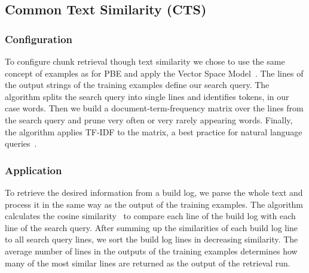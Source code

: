 \subsection{Common Text Similarity (CTS)}
\label{sec:expl-ts}

\subsubsection{Configuration}
To configure chunk retrieval though text similarity we chose to use the same concept of examples as for PBE\@
and apply the Vector Space Model~\cite{schutze2008introduction}.
The lines of the output strings of the training examples define our search query.
The algorithm splits the search query into single lines and identifies tokens, in our case words.
Then we build a document-term-frequency matrix over the lines from the search query and prune very often or very rarely appearing words.
Finally, the algorithm applies TF-IDF to the matrix, a best practice for natural language queries~\cite{lee1997document}.

\subsubsection{Application}
To retrieve the desired information from a build log, we parse the whole text and process it in the same way as the output of the training examples.
The algorithm calculates the cosine similarity~\cite{korenius2007principal} to compare each line of the build log with each line of the search query.
After summing up the similarities of each build log line to all search query lines, we sort the build log lines in decreasing similarity.
The average number of lines in the outputs of the training examples determines how many of the most similar lines are returned as the output of the retrieval run.

